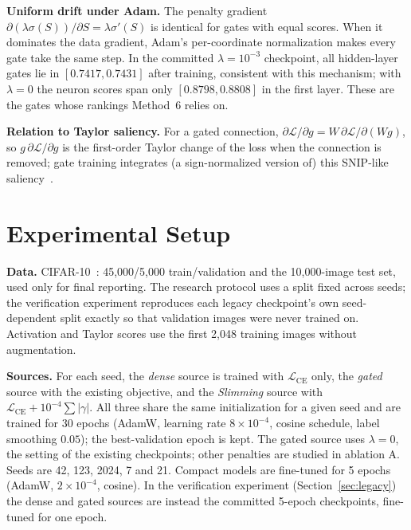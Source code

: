 \documentclass[conference]{IEEEtran}
\begin{document}
\textbf{Uniform drift under Adam.} The penalty gradient
$\partial(\lambda\sigma(S))/\partial S=\lambda\sigma'(S)$ is identical for gates with
equal scores. When it dominates the data gradient, Adam's per-coordinate normalization
makes every gate take the same step. In the committed $\lambda=10^{-3}$ checkpoint, all
hidden-layer gates lie in $[0.7417, 0.7431]$ after training, consistent with this
mechanism; with $\lambda=0$ the neuron scores span only $[0.8798, 0.8808]$ in the first
layer. These are the gates whose rankings Method~6 relies on.

\textbf{Relation to Taylor saliency.} For a gated connection,
$\partial\mathcal{L}/\partial g = W\,\partial\mathcal{L}/\partial(Wg)$, so
$g\,\partial\mathcal{L}/\partial g$ is the first-order Taylor change of the loss when the
connection is removed; gate training integrates (a sign-normalized version of) this
SNIP-like saliency~\cite{lee2019snip,molchanov2019importance}.

\section{Experimental Setup}\label{sec:setup}
\textbf{Data.} CIFAR-10~\cite{krizhevsky2009cifar}: 45{,}000/5{,}000 train/validation and
the 10{,}000-image test set, used only for final reporting. The research protocol uses a
split fixed across seeds; the verification experiment reproduces each legacy
checkpoint's own seed-dependent split exactly so that validation images were never
trained on. Activation and Taylor scores use the first 2{,}048 training images without
augmentation.

\textbf{Sources.} For each seed, the \emph{dense} source is trained with
$\mathcal{L}_{\mathrm{CE}}$ only, the \emph{gated} source with the existing objective,
and the \emph{Slimming} source with $\mathcal{L}_{\mathrm{CE}}+10^{-4}\sum|\gamma|$.
All three share the same initialization for a given seed and are trained for 30 epochs
(AdamW, learning rate $8\times10^{-4}$, cosine schedule, label smoothing $0.05$); the
best-validation epoch is kept. The gated source uses $\lambda=0$, the setting of the
existing checkpoints; other penalties are studied in ablation A. Seeds are 42, 123, 2024,
7 and 21. Compact models are fine-tuned for 5 epochs (AdamW, $2\times10^{-4}$, cosine).
In the verification experiment (Section~\ref{sec:legacy}) the dense and gated sources are
instead the committed 5-epoch checkpoints, fine-tuned for one epoch.
\end{document}

